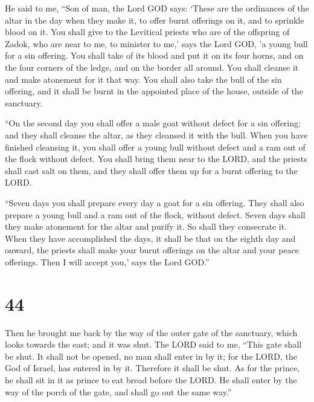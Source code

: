  He said to me, ``Son of man, the Lord GOD says: `These
are the ordinances of the altar in the day when they make it, to offer
burnt offerings on it, and to sprinkle blood on it.  You
shall give to the Levitical priests who are of the offspring of Zadok,
who are near to me, to minister to me,' says the Lord GOD, 'a young bull
for a sin offering.  You shall take of its blood and put
it on its four horns, and on the four corners of the ledge, and on the
border all around. You shall cleanse it and make atonement for it that
way.  You shall also take the bull of the sin offering,
and it shall be burnt in the appointed place of the house, outside of
the sanctuary.

 ``On the second day you shall offer a male goat without
defect for a sin offering; and they shall cleanse the altar, as they
cleansed it with the bull.  When you have finished
cleansing it, you shall offer a young bull without defect and a ram out
of the flock without defect.  You shall bring them near
to the LORD, and the priests shall cast salt on them, and they shall
offer them up for a burnt offering to the LORD.

 ``Seven days you shall prepare every day a goat for a
sin offering. They shall also prepare a young bull and a ram out of the
flock, without defect.  Seven days shall they make
atonement for the altar and purify it. So shall they consecrate it.
 When they have accomplished the days, it shall be that
on the eighth day and onward, the priests shall make your burnt
offerings on the altar and your peace offerings. Then I will accept
you,' says the Lord GOD.''

\hypertarget{section-42}{%
\section{44}\label{section-42}}

 Then he brought me back by the way of the outer gate of
the sanctuary, which looks towards the east; and it was shut.
 The LORD said to me, ``This gate shall be shut. It shall
not be opened, no man shall enter in by it; for the LORD, the God of
Israel, has entered in by it. Therefore it shall be shut. 
As for the prince, he shall sit in it as prince to eat bread before the
LORD. He shall enter by the way of the porch of the gate, and shall go
out the same way.''

